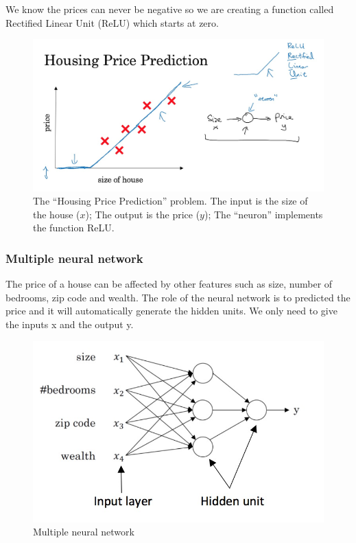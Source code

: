 \documentclass[UTF8]{article}
\begin{document}
We know the prices can never be negative so we are creating a function called Rectified Linear Unit
(ReLU) which starts at zero.
\begin{figure}[ht]
    \centering
    \includegraphics[width=40em]{figures/1-single-nn}
    \caption{The ``Housing Price Prediction'' problem. The input is the size of the house
    ($x$); The output is the price ($y$); The ``neuron'' implements the function
    ReLU.}
\end{figure}

\subsubsection{Multiple neural network}
The price of a house can be affected by other features such as size, number of bedrooms, zip code
and wealth. The role of the neural network is to predicted the price and it will automatically
generate the hidden units. We only need to give the inputs x and the output y.
\begin{figure}[ht]
    \centering
    \includegraphics[width=40em]{figures/1-multiple-nn}
    \caption{Multiple neural network}
\end{figure}
\end{document}
